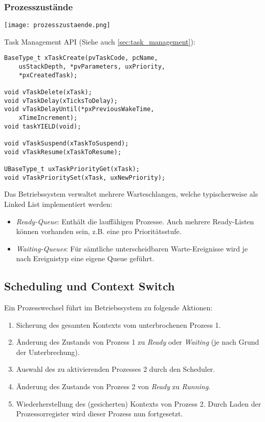 \subsubsection{Prozesszustände}

\texttt{[image: prozesszustaende.png]}

Task Management API (Siehe auch \ref{sec:task_management}):
\begin{lstlisting}[style=cppstyle]
BaseType_t xTaskCreate(pvTaskCode, pcName,
	usStackDepth, *pvParameters, uxPriority, 
	*pxCreatedTask);
	
void vTaskDelete(xTask);
void vTaskDelay(xTicksToDelay);
void vTaskDelayUntil(*pxPreviousWakeTime,
	xTimeIncrement);
void taskYIELD(void);
	
void vTaskSuspend(xTaskToSuspend);
void vTaskResume(xTaskToResume);

UBaseType_t uxTaskPriorityGet(xTask);
void vTaskPrioritySet(xTask, uxNewPriority);
\end{lstlisting}

Das Betriebssystem verwaltet mehrere Warteschlangen, welche typischerweise als Linked List implementiert werden:

\begin{itemize}
	\itemsep-.5em
	\item \textit{Ready-Queue}: Enthält die lauffähigen Prozesse. Auch mehrere Ready-Listen können vorhanden sein, z.B. eine pro Prioritätsstufe.
	\item \textit{Waiting-Queues}: Für sämtliche unterscheidbaren Warte-Ereignisse wird je nach Ereignistyp eine eigene Queue geführt.
\end{itemize}


\subsection{Scheduling und Context Switch}

Ein Prozesswechsel führt im Betriebssystem zu folgende Aktionen:

\begin{enumerate}
	\itemsep-.5em 
	\item Sicherung des gesamten Kontexts vom unterbrochenen Prozess 1.
	\item Änderung des Zustands von Prozess 1 zu \textit{Ready} oder \textit{Waiting} (je nach Grund der Unterbrechung).
	\item Auswahl des zu aktivierenden Prozesses 2 durch den Scheduler.
	\item Änderung des Zustands von Prozess 2 von \textit{Ready} zu \textit{Running}.
	\item Wiederherstellung des (gesicherten) Kontexts von Prozess 2. Durch Laden der Prozessorregister wird dieser Prozess nun fortgesetzt.
\end{enumerate}

